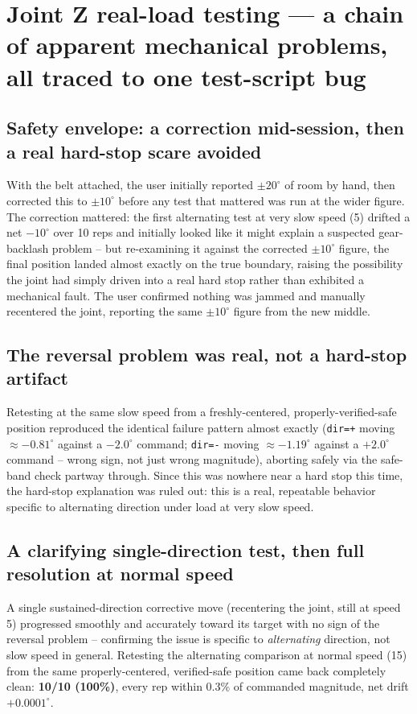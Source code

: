\documentclass[11pt,letterpaper]{article}
\begin{document}
\section{Joint Z real-load testing --- a chain of apparent mechanical problems, all traced to one test-script bug}
\label{sec:session-joint-z-real-load}

\subsection{Safety envelope: a correction mid-session, then a real hard-stop scare avoided}
With the belt attached, the user initially reported $\pm 20^\circ$ of room by hand, then corrected this to $\pm 10^\circ$ before any test that mattered was run at the wider figure. The correction mattered: the first alternating test at very slow speed (5) drifted a net $-10^\circ$ over 10 reps and initially looked like it might explain a suspected gear-backlash problem -- but re-examining it against the corrected $\pm 10^\circ$ figure, the final position landed almost exactly on the true boundary, raising the possibility the joint had simply driven into a real hard stop rather than exhibited a mechanical fault. The user confirmed nothing was jammed and manually recentered the joint, reporting the same $\pm 10^\circ$ figure from the new middle.

\subsection{The reversal problem was real, not a hard-stop artifact}
Retesting at the same slow speed from a freshly-centered, properly-verified-safe position reproduced the identical failure pattern almost exactly (\texttt{dir=+} moving $\approx -0.81^\circ$ against a $-2.0^\circ$ command; \texttt{dir=-} moving $\approx -1.19^\circ$ against a $+2.0^\circ$ command -- wrong sign, not just wrong magnitude), aborting safely via the safe-band check partway through. Since this was nowhere near a hard stop this time, the hard-stop explanation was ruled out: this is a real, repeatable behavior specific to alternating direction under load at very slow speed.

\subsection{A clarifying single-direction test, then full resolution at normal speed}
A single sustained-direction corrective move (recentering the joint, still at speed 5) progressed smoothly and accurately toward its target with no sign of the reversal problem -- confirming the issue is specific to \emph{alternating} direction, not slow speed in general. Retesting the alternating comparison at normal speed (15) from the same properly-centered, verified-safe position came back completely clean: \textbf{10/10 (100\%)}, every rep within 0.3\% of commanded magnitude, net drift $+0.0001^\circ$.
\end{document}
